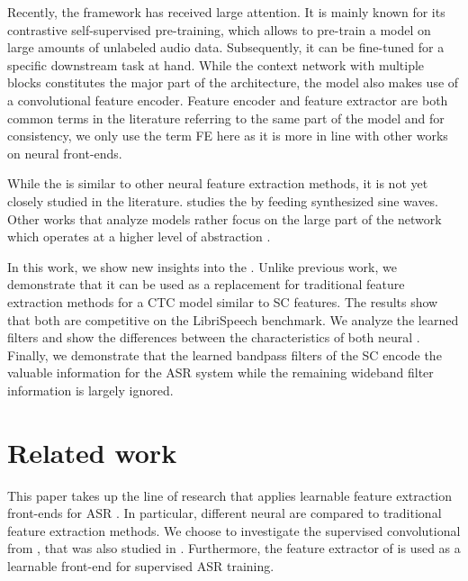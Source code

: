 \documentclass{INTERSPEECH2023}
\begin{document}
Recently, the \wvtwo framework \cite{facebook2020wav2vec2} has received large attention.
It is mainly known for its contrastive self-supervised pre-training, which allows to pre-train a model on large amounts of unlabeled audio data.
Subsequently, it can be fine-tuned for a specific downstream task at hand.
While the context network with multiple \transformer blocks constitutes the major part of the architecture, the \wvtwo model also makes use of a convolutional feature encoder.
Feature encoder \cite{facebook2020wav2vec2, facebook2020xlsr} and feature extractor \cite{asapp2022performance, vyas2022ondemand} are both common terms in the literature referring to the same part of the model and for consistency, we only use the term \acrfull{FE} here as it is more in line with other works on neural front-ends.

While the \wvtwo \fe is similar to other neural feature extraction methods, it is not yet closely studied in the literature.
\cite{choi2022w2v2fe} studies the \fe by feeding synthesized sine waves.
Other works that analyze \wvtwo models rather focus on the large \transformer part of the network which operates at a higher level of abstraction \cite{livescu2021wav2vec_analysis, fan21wvspeakerid, li2023exploration, dieck2022wav2vec}.

In this work, we show new insights into the \wvtwo \fe.
Unlike previous work, we demonstrate that it can be used as a replacement for traditional feature extraction methods for a \gls{CTC} model similar to \gls{SC} features.
The results show that both are competitive on the LibriSpeech benchmark.
We analyze the learned filters and show the differences between the characteristics of both neural \fes.
Finally, we demonstrate that the learned bandpass filters of the \gls{SC} \fe encode the valuable information for the \gls{ASR} system while the remaining wideband filter information is largely ignored.

\section{Related work}
This paper takes up the line of research that applies learnable feature extraction front-ends for \gls{ASR} \cite{palaz2015convolutional, golik15:cnn, tuske2018:waveform, ravanelli2018sincnet, sainath2015cldnn}.
In particular, different neural \fes are compared to traditional feature extraction methods.
We choose to investigate the supervised convolutional \fe from \cite{tuske2018:waveform}, that was also studied in \cite{vieting2021waveform}.
Furthermore, the feature extractor of \wvtwo \cite{facebook2020wav2vec2} is used as a learnable front-end for supervised \gls{ASR} training.
\end{document}
